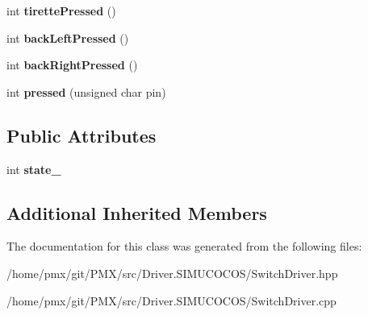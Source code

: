 \begin{DoxyCompactItemize}
int {\bfseries tirette\+Pressed} ()
\item 
\mbox{\label{classSwitchDriver_a97cf6ca8501fbd0ca937c366b32ee191}} 
int {\bfseries back\+Left\+Pressed} ()
\item 
\mbox{\label{classSwitchDriver_af20343abbad7e959ce0fadb3c8bdb145}} 
int {\bfseries back\+Right\+Pressed} ()
\item 
\mbox{\label{classSwitchDriver_a379d72f1adda71986eda15ac793e47b2}} 
int {\bfseries pressed} (unsigned char pin)
\end{DoxyCompactItemize}
\subsection*{Public Attributes}
\begin{DoxyCompactItemize}
\item 
\mbox{\label{classSwitchDriver_ae78d1b98589f3e65840e82361e9e0b59}} 
int {\bfseries state\+\_\+}
\end{DoxyCompactItemize}
\subsection*{Additional Inherited Members}


The documentation for this class was generated from the following files\+:\begin{DoxyCompactItemize}
\item 
/home/pmx/git/\+P\+M\+X/src/\+Driver.\+S\+I\+M\+U\+C\+O\+C\+O\+S/Switch\+Driver.\+hpp\item 
/home/pmx/git/\+P\+M\+X/src/\+Driver.\+S\+I\+M\+U\+C\+O\+C\+O\+S/Switch\+Driver.\+cpp\end{DoxyCompactItemize}
